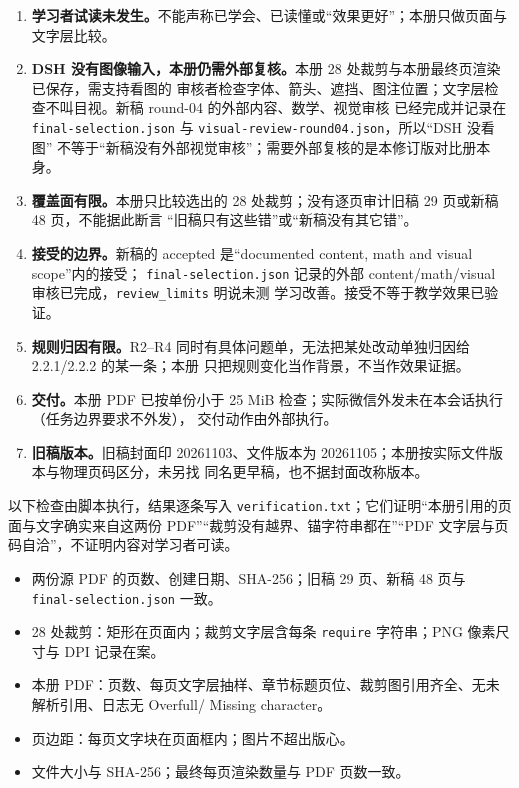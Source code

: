 \documentclass[11pt]{ctexart}
\begin{document}
\begin{enumerate}
\item \textbf{学习者试读未发生。}不能声称已学会、已读懂或“效果更好”；本册只做页面与文字层比较。
\item \textbf{DSH 没有图像输入，本册仍需外部复核。}本册 28 处裁剪与本册最终页渲染已保存，需支持看图的
审核者检查字体、箭头、遮挡、图注位置；文字层检查不叫目视。新稿 round-04 的外部内容、数学、视觉审核
已经完成并记录在 \texttt{final-selection.json} 与 \texttt{visual-review-round04.json}，所以“DSH 没看图”
不等于“新稿没有外部视觉审核”；需要外部复核的是本修订版对比册本身。
\item \textbf{覆盖面有限。}本册只比较选出的 28 处裁剪；没有逐页审计旧稿 29 页或新稿 48 页，不能据此断言
“旧稿只有这些错”或“新稿没有其它错”。
\item \textbf{接受的边界。}新稿的 accepted 是“documented content, math and visual scope”内的接受；
\texttt{final-selection.json} 记录的外部 content/math/visual 审核已完成，\texttt{review\_limits} 明说未测
学习改善。接受不等于教学效果已验证。
\item \textbf{规则归因有限。}R2--R4 同时有具体问题单，无法把某处改动单独归因给 2.2.1/2.2.2 的某一条；本册
只把规则变化当作背景，不当作效果证据。
\item \textbf{交付。}本册 PDF 已按单份小于 25 MiB 检查；实际微信外发未在本会话执行（任务边界要求不外发），
交付动作由外部执行。
\item \textbf{旧稿版本。}旧稿封面印 20261103、文件版本为 20261105；本册按实际文件版本与物理页码区分，未另找
同名更早稿，也不据封面改称版本。
\end{enumerate}

\clearpage
{}

以下检查由脚本执行，结果逐条写入 \texttt{verification.txt}；它们证明“本册引用的页面与文字确实来自这两份
PDF”“裁剪没有越界、锚字符串都在”“PDF 文字层与页码自洽”，不证明内容对学习者可读。

\begin{itemize}
\item 两份源 PDF 的页数、创建日期、SHA-256；旧稿 29 页、新稿 48 页与 \texttt{final-selection.json} 一致。
\item 28 处裁剪：矩形在页面内；裁剪文字层含每条 \texttt{require} 字符串；PNG 像素尺寸与 DPI 记录在案。
\item 本册 PDF：页数、每页文字层抽样、章节标题页位、裁剪图引用齐全、无未解析引用、日志无 Overfull/
Missing character。
\item 页边距：每页文字块在页面框内；图片不超出版心。
\item 文件大小与 SHA-256；最终每页渲染数量与 PDF 页数一致。
\end{itemize}
\end{document}
